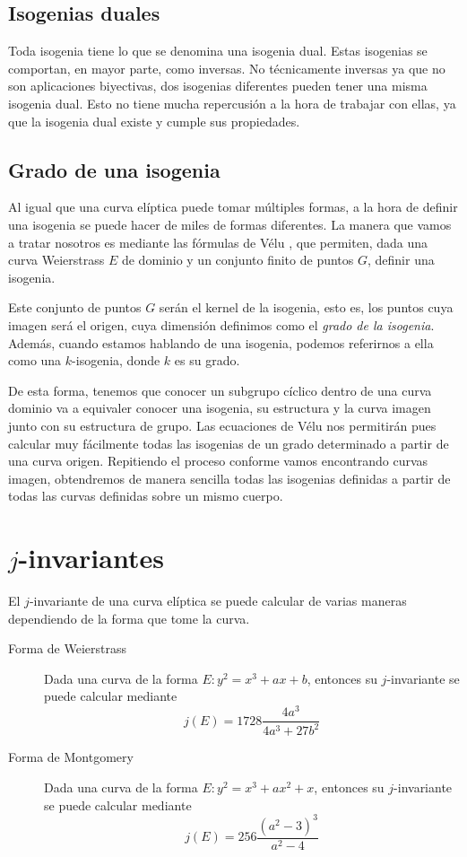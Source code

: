 \subsection{Isogenias duales}

Toda isogenia tiene lo que se denomina una isogenia dual. Estas isogenias se comportan, en mayor parte, como inversas. No técnicamente inversas ya que no son aplicaciones biyectivas, dos isogenias diferentes pueden tener una misma isogenia dual. Esto no tiene mucha repercusión a la hora de trabajar con ellas, ya que la isogenia dual existe y cumple sus propiedades. 

\subsection{Grado de una isogenia}

Al igual que una curva elíptica puede tomar múltiples formas, a la hora de definir una isogenia se puede hacer de miles de formas diferentes. La manera que vamos a tratar nosotros es mediante las fórmulas de Vélu \cite{velu}, que permiten, dada una curva Weierstrass $E$ de dominio y un conjunto finito de puntos $G$, definir una isogenia.

Este conjunto de puntos $G$ serán el kernel de la isogenia, esto es, los puntos cuya imagen será el origen, cuya dimensión definimos como el \textit{grado de la isogenia}. Además, cuando estamos hablando de una isogenia, podemos referirnos a ella como una $k$-isogenia, donde $k$ es su grado.

De esta forma, tenemos que conocer un subgrupo cíclico dentro de una curva dominio va a equivaler conocer una isogenia, su estructura y la curva imagen junto con su estructura de grupo. Las ecuaciones de Vélu nos permitirán pues calcular muy fácilmente todas las isogenias de un grado determinado a partir de una curva origen. Repitiendo el proceso conforme vamos encontrando curvas imagen, obtendremos de manera sencilla todas las isogenias definidas a partir de todas las curvas definidas sobre un mismo cuerpo.

%
%

\section{$j$-invariantes}

El $j$-invariante de una curva elíptica se puede calcular de varias maneras dependiendo de la forma que tome la curva.

\begin{description}
    \item[Forma de Weierstrass] Dada una curva de la forma $E: y^2 = x^3 + ax + b$, entonces su $j$-invariante se puede calcular mediante
    \[j(E) = 1728 \frac{4a^3}{4a^3 + 27b^2}\]

    \item[Forma de Montgomery] Dada una curva de la forma $E: y^2 = x^3 + ax^2 + x$, entonces su $j$-invariante se puede calcular mediante
    \[j(E) = 256 \frac{(a^2 - 3)^3}{a^2 - 4}\]
\end{description}

